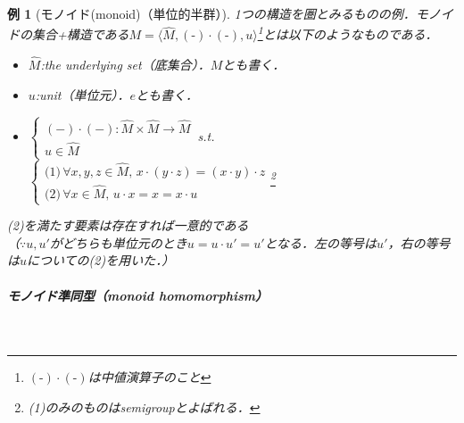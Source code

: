 \documentclass[dvipdfmx,a4j,10pt]{jsarticle}
\theoremstyle{mystyle1}
\theoremstyle{mystyle2}
\newtheorem{example}{例}
\begin{document}
\begin{example}[モノイド(monoid)（単位的半群）]
	1つの構造を圏とみるものの例．モノイドの集合+構造である$M=\langle \hat{M},(\textrm{-})\cdot(\textrm{-}),u\rangle$\footnote{$(\textrm{-})\cdot (\textrm{-})$は中値演算子のこと}とは以下のようなものである．

	\begin{itemize}
		\item $\hat{M}$:the underlying set（底集合）．$M$とも書く．
		\item $u$:unit（単位元）．$e$とも書く．
		\item $\begin{cases}
				      (-)\cdot(-):\hat{M}\times\hat{M}\to\hat{M} \\
				      u\in\hat{M}
			      \end{cases}$\,\textrm{s.t.}\,
		      $\begin{cases}
				      \textrm{(1)}\,\forall x,y,z\in\hat{M},\, x\cdot(y\cdot z)=(x\cdot y)\cdot z \\
				      \textrm{(2)}\,\forall x\in\hat{M},\, u\cdot x=x=x\cdot u
			      \end{cases}$\footnote{(1)のみのものはsemigroupとよばれる．}
	\end{itemize}
	(2)を満たす要素は存在すれば一意的である\\
	（$\because$$u,u'$がどちらも単位元のとき$u=u\cdot u'=u'$となる．左の等号は$u'$，右の等号は$u$についての(2)を用いた．）

		\subparagraph{モノイド準同型（monoid homomorphism）}\


\end{example}
\end{document}
